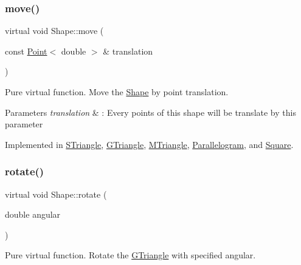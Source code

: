 \mbox{\label{classShape_a1f447acd6219cb10b9b7a40371519c46}} 
\subsubsection{\texorpdfstring{move()}{move()}}
{\footnotesize\ttfamily virtual void Shape\+::move (\begin{DoxyParamCaption}\item[{const \hyperlink{classPoint}{Point}$<$ double $>$ \&}]{translation }\end{DoxyParamCaption})\hspace{0.3cm}{\ttfamily [pure virtual]}}



Pure virtual function. Move the \hyperlink{classShape}{Shape} by point translation. 


\begin{DoxyParams}{Parameters}
{\em translation} & \+: Every points of this shape will be translate by this parameter \\
\hline
\end{DoxyParams}


Implemented in \hyperlink{classSTriangle_ac72888032cde56407193da9435e2fcc0}{S\+Triangle}, \hyperlink{classGTriangle_a6675f3448fca16c1afec576145a9b139}{G\+Triangle}, \hyperlink{classMTriangle_aa21f0514a8af2beba5ecf2ea5a22a4ef}{M\+Triangle}, \hyperlink{classParallelogram_ae8d51f9b629160df31c8a12c28da279e}{Parallelogram}, and \hyperlink{classSquare_a75b2fd22fc3895b83bc20728afb20b10}{Square}.

\mbox{\label{classShape_a2dea8616fd40f2d69fd208715921982a}} 
\subsubsection{\texorpdfstring{rotate()}{rotate()}}
{\footnotesize\ttfamily virtual void Shape\+::rotate (\begin{DoxyParamCaption}\item[{double}]{angular }\end{DoxyParamCaption})\hspace{0.3cm}{\ttfamily [pure virtual]}}



Pure virtual function. Rotate the \hyperlink{classGTriangle}{G\+Triangle} with specified angular. 


